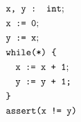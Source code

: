 \documentclass{article}
\begin{document}
	\begin{minipage}{.3\textwidth}
	\centering
	\begin{align*}
	&\texttt{x, y : int}; \\
	&\texttt{x := 0}; \\
	&\texttt{y := x}; \\
	&\texttt{while(*) \{} \\
	&\hspace*{1em} \texttt{x := x + 1}; \\
	&\hspace*{1em} \texttt{y := y + 1;} \\
	&\texttt{\}} \\
	& \texttt{assert(x != y)}
	\end{align*}
	
	
	
	\label{fig:square}
\end{minipage}%
\hfill
\end{document}
